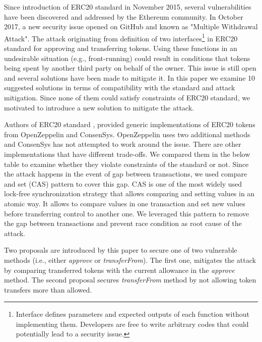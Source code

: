 Since introduction of ERC20 standard in November 2015, several vulnerabilities have been discovered and addressed by the Ethereum community. In October 2017, a new security issue opened on GitHub\cite{Ref13,Ref07} and known as "Multiple Withdrawal Attack". The attack originating from definition of two interfaces\footnote{Interface defines parameters and expected outputs of each function without implementing them. Developers are free to write arbitrary codes that could potentially lead to a security issue.} in ERC20 standard for approving and transferring tokens. Using these functions in an undesirable situation (e.g., front-running) could result in conditions that tokens being spent by another third party on behalf of the owner. This issue is still open and several solutions have been made to mitigate it. In this paper we examine 10 suggested solutions in terms of compatibility with the standard and attack mitigation. Since none of them could satisfy constraints of ERC20 standard, we motivated to introduce a new solution to mitigate the attack.

Authors of ERC20 standard \cite{Ref08}, provided generic implementations of ERC20 tokens from OpenZeppelin\cite{Ref10} and ConsenSys\cite{Ref11}. OpenZeppelin uses two additional methods and ConsenSys has not attempted to work around the issue. There are other implementations that have different trade-offs. We compared them in the below table to examine whether they violate constraints of the standard or not. Since the attack happens in the event of gap between transactions, we used compare and set (CAS) pattern\cite{Ref06} to cover this gap. CAS is one of the most widely used lock-free synchronization strategy that allows comparing and setting values in an atomic way. It allows to compare values in one transaction and set new values before transferring control to another one. We leveraged this pattern to remove the gap between transactions and prevent race condition as root cause of the attack.

Two proposals are introduced by this paper to secure one of two vulnerable methods (i.e., either \textit{approve} or \textit{transferFrom}). The first one, mitigates the attack by comparing transferred tokens with the current allowance in the \textit{approve} method. The second proposal secures \textit{transferFrom} method by not allowing token transfers more than allowed.

